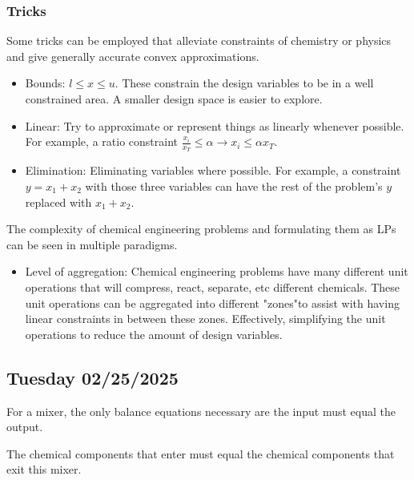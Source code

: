\subsubsection{Tricks}
Some tricks can be employed that alleviate constraints of chemistry or physics and give generally accurate convex approximations.
\begin{itemize}
    \item Bounds: $l \leq x \leq u$. These constrain the design variables to be in a well constrained area. A smaller design space is easier to explore.
    \item Linear: Try to approximate or represent things as linearly whenever possible. For example, a ratio constraint $\frac{x_i}{x_T} \leq \alpha \rightarrow x_i \leq \alpha x_T$.
    \item Elimination: Eliminating variables where possible. For example, a constraint $y = x_1 + x_2$ with those three variables can have the rest of the problem's $y$ replaced with $x_1 + x_2$.
\end{itemize}
The complexity of chemical engineering problems and formulating them as LPs can be seen in multiple paradigms.
\begin{itemize}
    \item Level of aggregation: Chemical engineering problems have many different unit operations that will compress, react, separate, etc different chemicals. These unit operations can be aggregated into different "zones"to assist with having linear constraints in between these zones. Effectively, simplifying the unit operations to reduce the amount of design variables.
\end{itemize}

\subsection{Tuesday 02/25/2025}
For a mixer, the only balance equations necessary are the input must equal the output.
\begin{center}
\end{center}
The chemical components that enter must equal the chemical components that exit this mixer.
